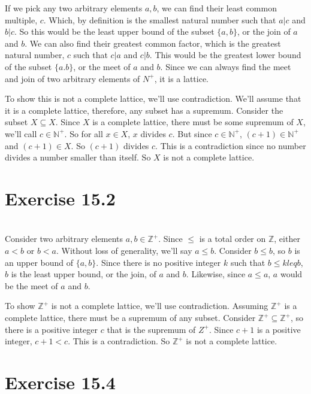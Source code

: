 \documentclass[11pt]{article}
\newcommand{\N}{\mathbb{N}}
\newcommand{\Z}{\mathbb{Z}}
\begin{document}
If we pick any two arbitrary elements $a,b$, we can find their least common multiple, $c$. Which, by definition is the smallest natural number such that $a|c$ and $b|c$. So this would be the least upper bound of the subset $\{a,b\}$, or the join of $a$ and $b$. We can also find their greatest common factor, which is the greatest natural number, $c$ such that $c|a$ and $c|b$. This would be the greatest lower bound of the subset $\{a.b\}$, or the meet of $a$ and $b$. Since we can always find the meet and join of two arbitrary elements of $N^+$, it is a lattice.

To show this is not a complete lattice, we'll use contradiction. We'll assume that it is a complete lattice, therefore, any subset has a supremum. Consider the subset $X\subseteq X$. Since $X$ is a complete lattice, there must be some supremum of $X$, we'll call $c\in\N^+$. So for all $x\in X$, $x$ divides $c$. But since $c\in\N^+$, $(c+1)\in\N^+$ and $(c+1)\in X$. So $(c+1)$ divides $c$. This is a contradiction since no number divides a number smaller than itself. So $X$ is not a complete lattice.

\section*{Exercise 15.2}
\\

Consider two arbitrary elements $a,b \in \Z^+$. Since $\leq$ is a total order on $\Z$, either $a<b$ or $b<a$. Without loss of generality, we'll say $a\leq b$. Consider $b \leq b$, so $b$ is an upper bound of $\{a,b\}$. Since there is no positive integer $k$ such that $b\leq k leq b$, $b$ is the least upper bound, or the join, of $a$ and $b$. Likewise, since $a\leq a$, $a$ would be the meet of $a$ and $b$.

To show $\Z^+$ is not a complete lattice, we'll use contradiction. Assuming $\Z^+$ is a complete lattice, there must be a supremum of any subset. Consider $\Z^+ \subseteq \Z^+$, so there is a positive integer $c$ that is the supremum of $Z^+$. Since $c+1$ is a positive integer, $c+1 < c$. This is a contradiction. So $\Z^+$ is not a complete lattice.

\newpage
\section*{Exercise 15.4}
\\
\end{document}
